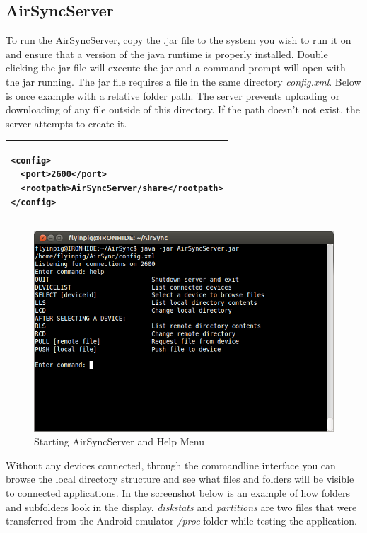 \documentclass[12pt]{article}
\begin{document}
\subsection{AirSyncServer}

To run the AirSyncServer, copy the .jar file to the system you wish to run it on and ensure that a version of the java runtime is properly installed. Double clicking the jar file will execute the jar and a command prompt will open with the jar running. The jar file requires a file in the same directory \emph{config.xml}. Below is once example with a relative folder path. The server prevents uploading or downloading of any file outside of this directory. If the path doesn't not exist, the server attempts to create it.

\begin{center}
\begin{tabular}{|l|}
\hline
\begin{lstlisting}
<config>
  <port>2600</port>
  <rootpath>AirSyncServer/share</rootpath>
</config>
\end{lstlisting}\\
\hline
\end{tabular}
\end{center}

\begin{figure}[H]
\center
\includegraphics[width=1\textwidth]{starting-and-help.png}
\caption{Starting AirSyncServer and Help Menu}
\end{figure}

Without any devices connected, through the commandline interface you can browse the local directory structure and see what files and folders will be visible to connected applications. In the screenshot below is an example of how folders and subfolders look in the display. \emph{diskstats} and \emph{partitions} are two files that were transferred from the Android emulator \emph{/proc} folder while testing the application.
\end{document}

